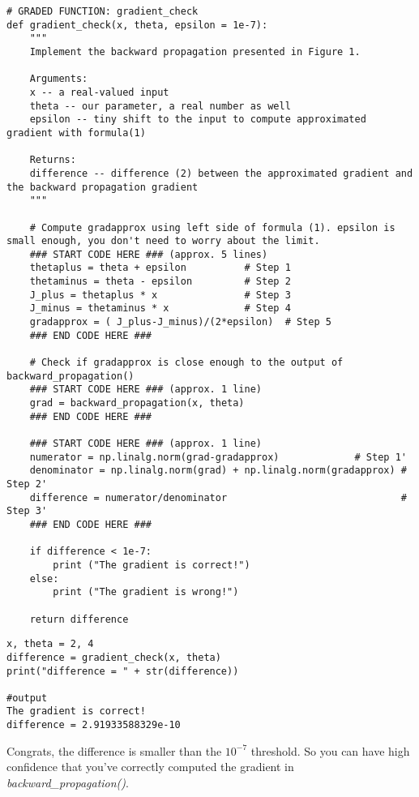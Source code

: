 \begin{verbatim}
# GRADED FUNCTION: gradient_check
def gradient_check(x, theta, epsilon = 1e-7):
    """
    Implement the backward propagation presented in Figure 1.
    
    Arguments:
    x -- a real-valued input
    theta -- our parameter, a real number as well
    epsilon -- tiny shift to the input to compute approximated gradient with formula(1)
    
    Returns:
    difference -- difference (2) between the approximated gradient and the backward propagation gradient
    """
    
    # Compute gradapprox using left side of formula (1). epsilon is small enough, you don't need to worry about the limit.
    ### START CODE HERE ### (approx. 5 lines)
    thetaplus = theta + epsilon          # Step 1
    thetaminus = theta - epsilon         # Step 2
    J_plus = thetaplus * x               # Step 3
    J_minus = thetaminus * x             # Step 4
    gradapprox = ( J_plus-J_minus)/(2*epsilon)  # Step 5
    ### END CODE HERE ###
    
    # Check if gradapprox is close enough to the output of backward_propagation()
    ### START CODE HERE ### (approx. 1 line)
    grad = backward_propagation(x, theta)
    ### END CODE HERE ###
    
    ### START CODE HERE ### (approx. 1 line)
    numerator = np.linalg.norm(grad-gradapprox)             # Step 1'
    denominator = np.linalg.norm(grad) + np.linalg.norm(gradapprox) # Step 2'
    difference = numerator/denominator                              # Step 3'
    ### END CODE HERE ###
    
    if difference < 1e-7:
        print ("The gradient is correct!")
    else:
        print ("The gradient is wrong!")
    
    return difference
\end{verbatim}    

\begin{verbatim}
x, theta = 2, 4
difference = gradient_check(x, theta)
print("difference = " + str(difference))

#output
The gradient is correct!
difference = 2.91933588329e-10
\end{verbatim}    


Congrats, the difference is smaller than the $10^{-7}$ threshold. So you can have high confidence that you've correctly computed the gradient in \emph{backward\_propagation()}. 

